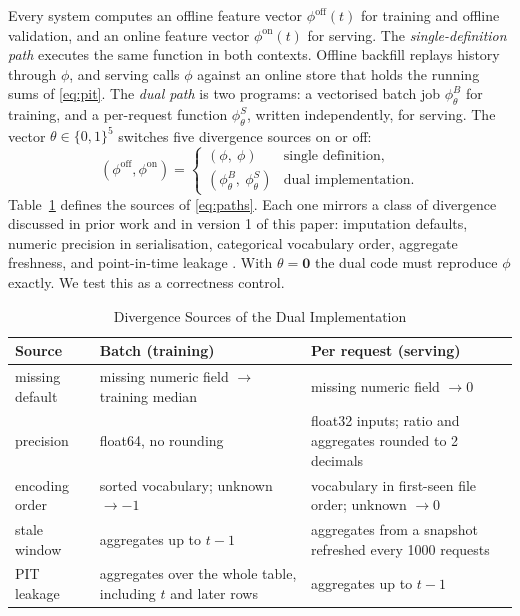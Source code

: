 \documentclass[journal]{IEEEtran}
\begin{document}
Every system computes an offline feature vector $\phi^{\mathrm{off}}(t)$ for training and offline validation, and an online feature vector $\phi^{\mathrm{on}}(t)$ for serving. The \emph{single-definition path} executes the same function in both contexts. Offline backfill replays history through $\phi$, and serving calls $\phi$ against an online store that holds the running sums of \eqref{eq:pit}. The \emph{dual path} is two programs: a vectorised batch job $\phi^{B}_{\theta}$ for training, and a per-request function $\phi^{S}_{\theta}$, written independently, for serving. The vector $\theta\in\{0,1\}^5$ switches five divergence sources on or off:
\begin{equation}
\left(\phi^{\mathrm{off}},\phi^{\mathrm{on}}\right)=
\begin{cases}
(\phi,\ \phi) & \text{single definition},\\
(\phi^{B}_{\theta},\ \phi^{S}_{\theta}) & \text{dual implementation}.
\end{cases}
\label{eq:paths}
\end{equation}
Table~\ref{tab:sources} defines the sources of \eqref{eq:paths}. Each one mirrors a class of divergence discussed in prior work and in version 1 of this paper: imputation defaults, numeric precision in serialisation, categorical vocabulary order, aggregate freshness, and point-in-time leakage \cite{polyzotis2018lifecycle,breck2017mltestscore,kaufman2012leakage}. With $\theta=\mathbf{0}$ the dual code must reproduce $\phi$ exactly. We test this as a correctness control.

\begin{table}[!t]
\caption{Divergence Sources of the Dual Implementation}
\label{tab:sources}
\centering
\footnotesize
\setlength{\tabcolsep}{3pt}
\begin{tabular}{@{}>{\raggedright\arraybackslash}p{1.45cm}>{\raggedright\arraybackslash}p{3.3cm}>{\raggedright\arraybackslash}p{3.3cm}@{}}
\toprule
Source & Batch (training) & Per request (serving) \\
\midrule
missing default & missing numeric field $\to$ training median & missing numeric field $\to 0$ \\\addlinespace[3pt]
precision & float64, no rounding & float32 inputs; ratio and aggregates rounded to 2 decimals \\\addlinespace[3pt]
encoding order & sorted vocabulary; unknown $\to -1$ & vocabulary in first-seen file order; unknown $\to 0$ \\\addlinespace[3pt]
stale window & aggregates up to $t-1$ & aggregates from a snapshot refreshed every 1000 requests \\\addlinespace[3pt]
PIT leakage & aggregates over the whole table, including $t$ and later rows & aggregates up to $t-1$ \\
\bottomrule
\end{tabular}
\end{table}
\end{document}
